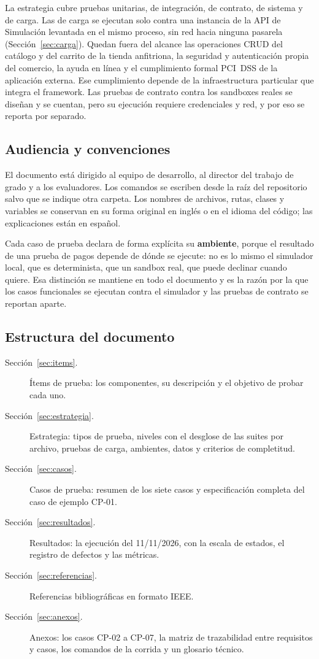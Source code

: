 La estrategia cubre pruebas unitarias, de integración, de contrato, de sistema y de carga. Las de carga se ejecutan solo contra una instancia de la API de Simulación levantada en el mismo proceso, sin red hacia ninguna pasarela (Sección~\ref{sec:carga}). Quedan fuera del alcance las operaciones CRUD del catálogo y del carrito de la tienda anfitriona, la seguridad y autenticación propia del comercio, la ayuda en línea y el cumplimiento formal PCI~DSS de la aplicación externa. Ese cumplimiento depende de la infraestructura particular que integra el framework. Las pruebas de contrato contra los sandboxes reales se diseñan y se cuentan, pero su ejecución requiere credenciales y red, y por eso se reporta por separado.

\subsection{Audiencia y convenciones}

El documento está dirigido al equipo de desarrollo, al director del trabajo de grado y a los evaluadores. Los comandos se escriben desde la raíz del repositorio salvo que se indique otra carpeta. Los nombres de archivos, rutas, clases y variables se conservan en su forma original en inglés o en el idioma del código; las explicaciones están en español.

Cada caso de prueba declara de forma explícita su \textbf{ambiente}, porque el resultado de una prueba de pagos depende de dónde se ejecute: no es lo mismo el simulador local, que es determinista, que un sandbox real, que puede declinar cuando quiere. Esa distinción se mantiene en todo el documento y es la razón por la que los casos funcionales se ejecutan contra el simulador y las pruebas de contrato se reportan aparte.

\subsection{Estructura del documento}

\begin{description}
  \item[Sección~\ref{sec:items}.] Ítems de prueba: los componentes, su descripción y el objetivo de probar cada uno.
  \item[Sección~\ref{sec:estrategia}.] Estrategia: tipos de prueba, niveles con el desglose de las suites por archivo, pruebas de carga, ambientes, datos y criterios de completitud.
  \item[Sección~\ref{sec:casos}.] Casos de prueba: resumen de los siete casos y especificación completa del caso de ejemplo CP-01.
  \item[Sección~\ref{sec:resultados}.] Resultados: la ejecución del 11/11/2026, con la escala de estados, el registro de defectos y las métricas.
  \item[Sección~\ref{sec:referencias}.] Referencias bibliográficas en formato IEEE.
  \item[Sección~\ref{sec:anexos}.] Anexos: los casos CP-02 a CP-07, la matriz de trazabilidad entre requisitos y casos, los comandos de la corrida y un glosario técnico.
\end{description}

